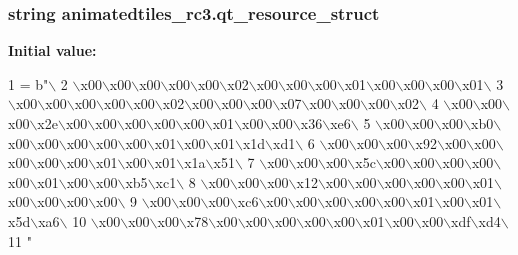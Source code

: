 \subsubsection[{qt\+\_\+resource\+\_\+struct}]{\setlength{\rightskip}{0pt plus 5cm}string animatedtiles\+\_\+rc3.\+qt\+\_\+resource\+\_\+struct}\label{namespaceanimatedtiles__rc3_a4770cecf6f4d9308f9f009d2f7f67e94}
{\bfseries Initial value\+:}
\begin{DoxyCode}
1 = b\textcolor{stringliteral}{"\(\backslash\)}
2 \textcolor{stringliteral}{\(\backslash\)x00\(\backslash\)x00\(\backslash\)x00\(\backslash\)x00\(\backslash\)x00\(\backslash\)x02\(\backslash\)x00\(\backslash\)x00\(\backslash\)x00\(\backslash\)x01\(\backslash\)x00\(\backslash\)x00\(\backslash\)x00\(\backslash\)x01\(\backslash\)}
3 \textcolor{stringliteral}{\(\backslash\)x00\(\backslash\)x00\(\backslash\)x00\(\backslash\)x00\(\backslash\)x00\(\backslash\)x02\(\backslash\)x00\(\backslash\)x00\(\backslash\)x00\(\backslash\)x07\(\backslash\)x00\(\backslash\)x00\(\backslash\)x00\(\backslash\)x02\(\backslash\)}
4 \textcolor{stringliteral}{\(\backslash\)x00\(\backslash\)x00\(\backslash\)x00\(\backslash\)x2e\(\backslash\)x00\(\backslash\)x00\(\backslash\)x00\(\backslash\)x00\(\backslash\)x00\(\backslash\)x01\(\backslash\)x00\(\backslash\)x00\(\backslash\)x36\(\backslash\)xe6\(\backslash\)}
5 \textcolor{stringliteral}{\(\backslash\)x00\(\backslash\)x00\(\backslash\)x00\(\backslash\)xb0\(\backslash\)x00\(\backslash\)x00\(\backslash\)x00\(\backslash\)x00\(\backslash\)x00\(\backslash\)x01\(\backslash\)x00\(\backslash\)x01\(\backslash\)x1d\(\backslash\)xd1\(\backslash\)}
6 \textcolor{stringliteral}{\(\backslash\)x00\(\backslash\)x00\(\backslash\)x00\(\backslash\)x92\(\backslash\)x00\(\backslash\)x00\(\backslash\)x00\(\backslash\)x00\(\backslash\)x00\(\backslash\)x01\(\backslash\)x00\(\backslash\)x01\(\backslash\)x1a\(\backslash\)x51\(\backslash\)}
7 \textcolor{stringliteral}{\(\backslash\)x00\(\backslash\)x00\(\backslash\)x00\(\backslash\)x5c\(\backslash\)x00\(\backslash\)x00\(\backslash\)x00\(\backslash\)x00\(\backslash\)x00\(\backslash\)x01\(\backslash\)x00\(\backslash\)x00\(\backslash\)xb5\(\backslash\)xc1\(\backslash\)}
8 \textcolor{stringliteral}{\(\backslash\)x00\(\backslash\)x00\(\backslash\)x00\(\backslash\)x12\(\backslash\)x00\(\backslash\)x00\(\backslash\)x00\(\backslash\)x00\(\backslash\)x00\(\backslash\)x01\(\backslash\)x00\(\backslash\)x00\(\backslash\)x00\(\backslash\)x00\(\backslash\)}
9 \textcolor{stringliteral}{\(\backslash\)x00\(\backslash\)x00\(\backslash\)x00\(\backslash\)xc6\(\backslash\)x00\(\backslash\)x00\(\backslash\)x00\(\backslash\)x00\(\backslash\)x00\(\backslash\)x01\(\backslash\)x00\(\backslash\)x01\(\backslash\)x5d\(\backslash\)xa6\(\backslash\)}
10 \textcolor{stringliteral}{\(\backslash\)x00\(\backslash\)x00\(\backslash\)x00\(\backslash\)x78\(\backslash\)x00\(\backslash\)x00\(\backslash\)x00\(\backslash\)x00\(\backslash\)x00\(\backslash\)x01\(\backslash\)x00\(\backslash\)x00\(\backslash\)xdf\(\backslash\)xd4\(\backslash\)}
11 \textcolor{stringliteral}{"}
\end{DoxyCode}

